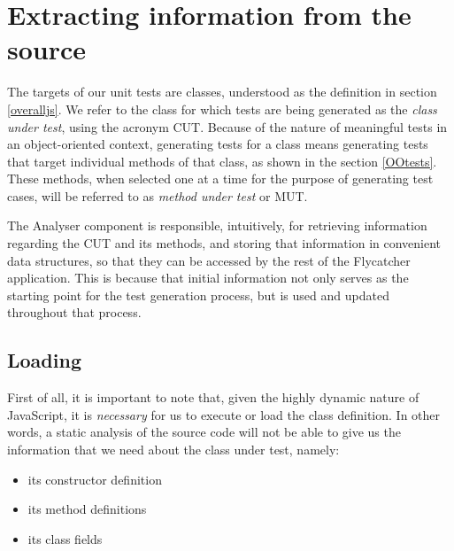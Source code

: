 \chapter{Extracting information from the source}

The targets of our unit tests are classes, understood as the definition in section \ref{overalljs}. We refer to the class for which tests are being generated as the \emph{class under test}, using the acronym CUT. Because of the nature of meaningful tests in an object-oriented context, generating tests for a class means generating tests that target individual methods of that class, as shown in the section \ref{OOtests}. These methods, when selected one at a time for the purpose of generating test cases, will be referred to as \emph{method under test} or MUT.

The \textsf{Analyser} component is responsible, intuitively, for retrieving information regarding the CUT and its methods, and storing that information in convenient data structures, so that they can be accessed by the rest of the \textsf{Flycatcher} application. This is because that initial information not only serves as the starting point for the test generation process, but is used and updated throughout that process.


\section{Loading}

First of all, it is important to note that, given the highly dynamic nature of JavaScript, it is \emph{necessary} for us to execute or load the class definition. In other words, a static analysis of the source code will not be able to give us the information that we need about the class under test, namely:

\begin{itemize}
   \item its constructor definition
   \item its method definitions
   \item its class fields
\end{itemize}

